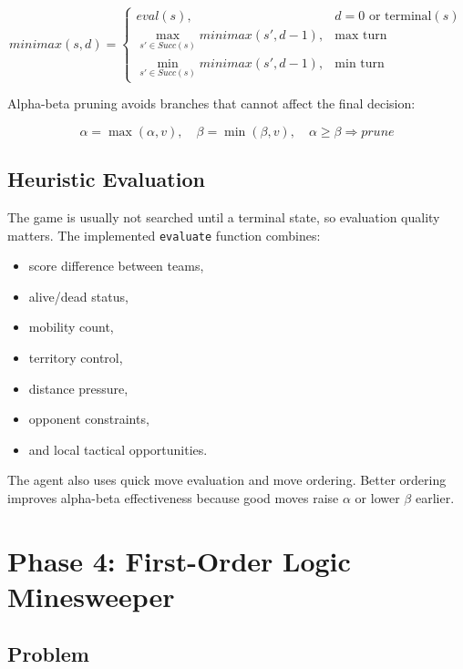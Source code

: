 \documentclass[11pt,a4paper]{article}
\newcommand{\code}[1]{\texttt{#1}}
\begin{document}
\begin{equation}
    minimax(s,d) =
    \begin{cases}
        eval(s), & d=0 \text{ or terminal}(s) \\
        \max_{s' \in Succ(s)} minimax(s', d-1), & \text{max turn} \\
        \min_{s' \in Succ(s)} minimax(s', d-1), & \text{min turn}
    \end{cases}
\end{equation}

Alpha-beta pruning avoids branches that cannot affect the final decision:

\begin{equation}
    \alpha = \max(\alpha, v),\quad \beta = \min(\beta, v),\quad \alpha \geq \beta \Rightarrow prune
\end{equation}

\subsection{Heuristic Evaluation}

The game is usually not searched until a terminal state, so evaluation quality matters. The implemented \code{evaluate} function combines:

\begin{itemize}[leftmargin=*]
    \item score difference between teams,
    \item alive/dead status,
    \item mobility count,
    \item territory control,
    \item distance pressure,
    \item opponent constraints,
    \item and local tactical opportunities.
\end{itemize}

The agent also uses quick move evaluation and move ordering. Better ordering improves alpha-beta effectiveness because good moves raise \(\alpha\) or lower \(\beta\) earlier.

\section{Phase 4: First-Order Logic Minesweeper}

\subsection{Problem}
\end{document}
